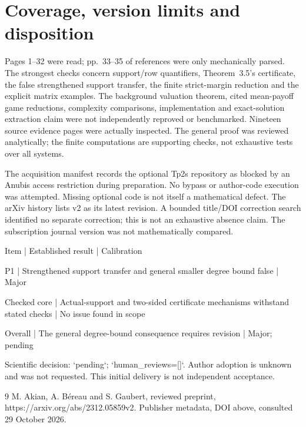 \documentclass[10pt]{article}
\begin{document}
\section*{Coverage, version limits and disposition}
Pages 1–32 were read; pp. 33–35 of references were only mechanically parsed. The strongest checks concern support/row quantifiers, Theorem 3.5’s certificate, the false strengthened support transfer, the finite strict-margin reduction and the explicit matrix examples. The background valuation theorem, cited mean-payoff game reductions, complexity comparisons, implementation and exact-solution extraction claim were not independently reproved or benchmarked. Nineteen source evidence pages were actually inspected. The general proof was reviewed analytically; the finite computations are supporting checks, not exhaustive tests over all systems.\par
The acquisition manifest records the optional Tp2s repository as blocked by an Anubis access restriction during preparation. No bypass or author-code execution was attempted. Missing optional code is not itself a mathematical defect. The arXiv history lists v2 as its latest revision. A bounded title/DOI correction search identified no separate correction; this is not an exhaustive absence claim. The subscription journal version was not mathematically compared.\par
Item | Established result | Calibration\par
P1 | Strengthened support transfer and general smaller degree bound false | Major\par
Checked core | Actual-support and two-sided certificate mechanisms withstand stated checks | No issue found in scope\par
Overall | The general degree-bound consequence requires revision | Major; pending\par
Scientific decision: `pending`; `human\_reviews=[]`. Author adoption is unknown and was not requested. This initial delivery is not independent acceptance.\par
9 M. Akian, A. Béreau and S. Gaubert, reviewed preprint, https://arxiv.org/abs/2312.05859v2. Publisher metadata, DOI above, consulted 29 October 2026.\par
\end{document}
